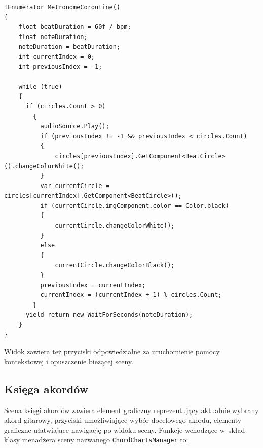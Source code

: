 \begin{lstlisting}[style=sharpcstyle,caption=Wątek \texttt{MetronomeCoroutine}, label=lst:2]
IEnumerator MetronomeCoroutine()
{
    float beatDuration = 60f / bpm;
    float noteDuration;
    noteDuration = beatDuration;
    int currentIndex = 0;
    int previousIndex = -1;

    while (true)
    {
      if (circles.Count > 0)
        {
          audioSource.Play(); 
          if (previousIndex != -1 && previousIndex < circles.Count)
          {
              circles[previousIndex].GetComponent<BeatCircle>().changeColorWhite();
          }          
          var currentCircle = circles[currentIndex].GetComponent<BeatCircle>();
          if (currentCircle.imgComponent.color == Color.black)
          {
              currentCircle.changeColorWhite();
          }
          else
          {
              currentCircle.changeColorBlack();
          }
          previousIndex = currentIndex;
          currentIndex = (currentIndex + 1) % circles.Count;
        }
      yield return new WaitForSeconds(noteDuration);
    }
}
\end{lstlisting}

Widok zawiera też przyciski odpowiedzialne za uruchomienie pomocy kontekstowej i opuszczenie bieżącej sceny.

\subsection{Księga akordów}
Scena księgi akordów zawiera element graficzny reprezentujący aktualnie wybrany akord gitarowy, przyciski umożliwiające wybór docelowego akordu, elementy graficzne ułatwiające nawigację po widoku sceny. Funkcje wchodzące w~skład klasy menadżera sceny nazwanego \texttt{ChordChartsManager} to:

